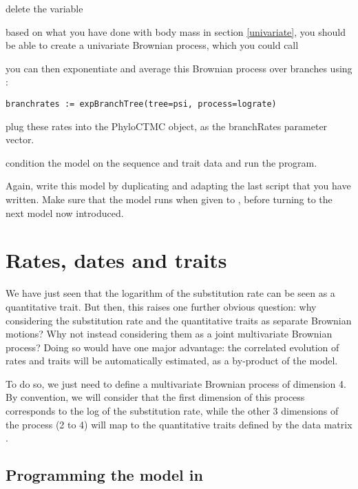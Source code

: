 delete the  variable

based on what you have done with body mass in section \ref{univariate}, you should be able to create a univariate Brownian process, which you could call 

you can then exponentiate and average this Brownian process over branches using :
{\tt \small \begin{snugshade*}
\begin{lstlisting}
branchrates := expBranchTree(tree=psi, process=lograte)
\end{lstlisting}
\end{snugshade*}}

plug these rates into the PhyloCTMC object, as the branchRates parameter vector.

condition the model on the sequence and trait data and run the program.

Again, write this model by duplicating and adapting the last script that you have written. Make sure that the model runs when given to \RevBayes, before turning to the next model now introduced.

\section{Rates, dates and traits}

We have just seen that the logarithm of the substitution rate can be seen as a quantitative trait. But then, this raises one further obvious question: why considering the substitution rate and the quantitative traits as separate Brownian motions? Why not instead considering them as a joint multivariate Brownian process? Doing so would have one major advantage: the correlated evolution of rates and traits will be automatically estimated, as a by-product of the model.

To do so, we just need to define a multivariate Brownian process of dimension 4.
By convention, we will consider that the first dimension of this process
corresponds to the log of the substitution rate,
while the other 3 dimensions of the process (2 to 4) will map to the quantitative traits defined by the data matrix
\citep{Lartillot2011}.

\subsection{Programming the model in \RevBayes}

